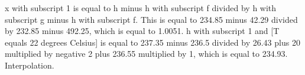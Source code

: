 x with subscript 1 is equal to h minus h with subscript f divided by h with subscript g minus h with subscript f. This is equal to 234.85 minus 42.29 divided by 232.85 minus 492.25, which is equal to 1.0051. h with subscript 1 and [T equals 22 degrees Celsius] is equal to 237.35 minus 236.5 divided by 26.43 plus 20 multiplied by negative 2 plus 236.55 multiplied by 1, which is equal to 234.93. Interpolation.
